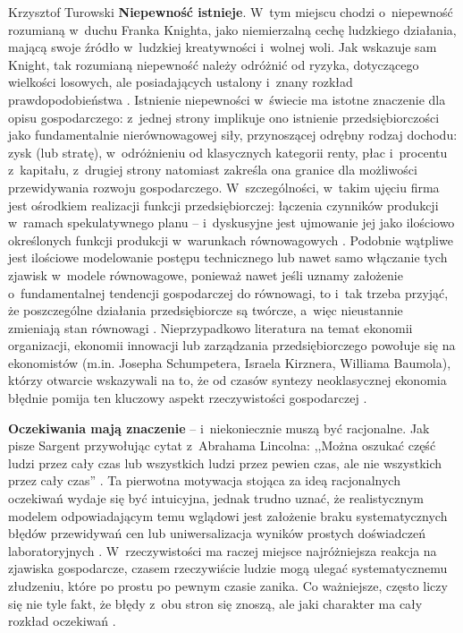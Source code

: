 \begin{artplenv}{Krzysztof Turowski}
\textbf{Niepewność istnieje}. W~tym miejscu chodzi o~niepewność rozumianą w~duchu Franka Knighta, jako niemierzalną
cechę ludzkiego działania, mającą swoje źródło w~ludzkiej kreatywności i~wolnej woli. Jak wskazuje sam Knight, tak
rozumianą niepewność należy odróżnić od ryzyka, dotyczącego wielkości losowych, ale posiadających ustalony i~znany
rozkład prawdopodobieństwa
\parencite{knight_risk_1921_tur}.
Istnienie niepewności w~świecie ma istotne
znaczenie dla opisu gospodarczego: z~jednej strony implikuje ono istnienie przedsiębiorczości jako fundamentalnie
nierównowagowej siły, przynoszącej odrębny rodzaj dochodu: zysk (lub stratę), w~odróżnieniu od klasycznych kategorii
renty, płac i~procentu z~kapitału, z~drugiej strony natomiast zakreśla ona granice dla możliwości przewidywania rozwoju
gospodarczego. W~szczególności, w~takim ujęciu firma jest ośrodkiem realizacji funkcji przedsiębiorczej: łączenia
czynników produkcji w~ramach spekulatywnego planu  --  i~dyskusyjne jest ujmowanie jej jako ilościowo określonych
funkcji produkcji w~warunkach równowagowych
\parencite{baumol_entrepreneurship_1968}.
Podobnie wątpliwe jest ilościowe
modelowanie postępu technicznego lub nawet samo włączanie tych zjawisk w~modele równowagowe, ponieważ nawet jeśli
uznamy założenie o~fundamentalnej tendencji gospodarczej do równowagi, to i~tak trzeba przyjąć, że poszczególne
działania przedsiębiorcze są twórcze, a~więc nieustannie zmieniają stan równowagi
\parencite{schumpeter_creative_1947}.
Nieprzypadkowo literatura na temat ekonomii organizacji, ekonomii innowacji lub zarządzania przedsiębiorczego
powołuje się na ekonomistów (m.in. Josepha Schumpetera, Israela Kirznera, Williama Baumola), którzy otwarcie wskazywali
na to, że od czasów syntezy neoklasycznej ekonomia błędnie pomija ten kluczowy aspekt rzeczywistości gospodarczej
\parencite{foss_organizing_2012}.

\textbf{Oczekiwania mają znaczenie}  --  i~niekoniecznie muszą być racjonalne. Jak pisze Sargent przywołując cytat
z~Abrahama Lincolna: ,,Można oszukać część ludzi przez cały czas lub wszystkich ludzi przez pewien czas, ale nie
wszystkich przez cały czas''
\parencite{henderson_rational_2008}.
Ta pierwotna motywacja stojąca za ideą
racjonalnych oczekiwań wydaje się być intuicyjna, jednak trudno uznać, że realistycznym modelem odpowiadającym temu
wglądowi jest założenie braku systematycznych błędów przewidywań cen lub uniwersalizacja wyników prostych doświadczeń
laboratoryjnych
\parencite{colander_financial_2009}.
W~rzeczywistości ma raczej miejsce najróżniejsza
reakcja na zjawiska gospodarcze, czasem rzeczywiście ludzie mogą ulegać systematycznemu złudzeniu, które po prostu po
pewnym czasie zanika. Co ważniejsze, często liczy się nie tyle fakt, że błędy z~obu stron się znoszą, ale jaki
charakter ma cały rozkład oczekiwań
\parencite{lachmann_macro-economic_1973}.


\end{artplenv}
